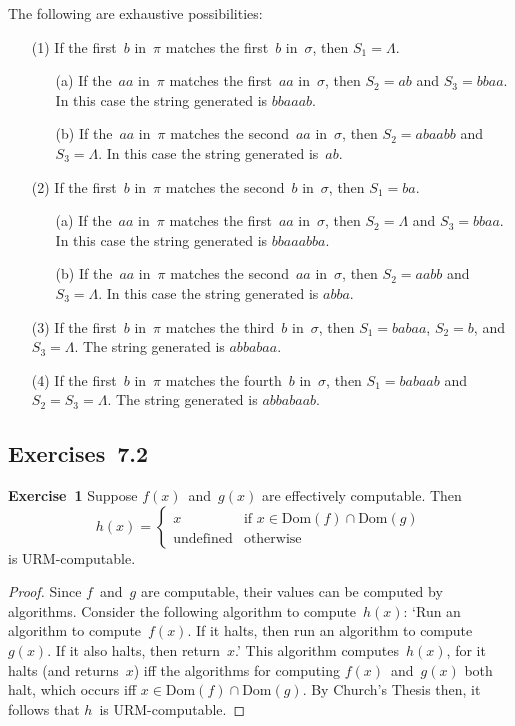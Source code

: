 \documentclass[letterpaper]{article}
\newcommand{\exercise}[2][]{\noindent\textbf{Exercise~{#2}}\ifthenelse{\isempty{#1}}{\textbf{.}}{ ({#1})\textbf{.}}}
\newcommand{\sect}{\cap}
\newcommand{\dom}{\mathrm{Dom}}
\theoremstyle{plain}
\theoremstyle{definition}
\theoremstyle{remark}
\begin{document}
The following are exhaustive possibilities:
\begin{enumerate}[itemsep=0pt]
\item[(1)] If the first~$b$ in~$\pi$ matches the first~$b$ in~$\sigma$, then $S_1=\Lambda$.
\begin{enumerate}[itemsep=0pt]
\item[(a)] If the~$aa$ in~$\pi$ matches the first~$aa$ in~$\sigma$, then $S_2=ab$ and $S_3=bbaa$. In this case the string generated is $bbaaab$.
\item[(b)] If the~$aa$ in~$\pi$ matches the second~$aa$ in~$\sigma$, then $S_2=abaabb$ and $S_3=\Lambda$. In this case the string generated is~$ab$.
\end{enumerate}
\item[(2)] If the first~$b$ in~$\pi$ matches the second~$b$ in~$\sigma$, then $S_1=ba$.
\begin{enumerate}[itemsep=0pt]
\item[(a)] If the~$aa$ in~$\pi$ matches the first~$aa$ in~$\sigma$, then $S_2=\Lambda$ and $S_3=bbaa$. In this case the string generated is $bbaaabba$.
\item[(b)] If the~$aa$ in~$\pi$ matches the second~$aa$ in~$\sigma$, then $S_2=aabb$ and $S_3=\Lambda$. In this case the string generated is $abba$.
\end{enumerate}
\item[(3)] If the first~$b$ in~$\pi$ matches the third~$b$ in~$\sigma$, then $S_1=babaa$, $S_2=b$, and $S_3=\Lambda$. The string generated is $abbabaa$.
\item[(4)] If the first~$b$ in~$\pi$ matches the fourth~$b$ in~$\sigma$, then $S_1=babaab$ and $S_2=S_3=\Lambda$. The string generated is $abbabaab$.
\end{enumerate}

\subsection*{Exercises~7.2}
\exercise{1}
Suppose $f(x)$~and~$g(x)$ are effectively computable. Then
$$h(x)=\begin{cases}
x&\text{if }x\in\dom(f)\sect\dom(g)\\
\text{undefined}&\text{otherwise}
\end{cases}$$
is URM-computable.
\begin{proof}
Since $f$~and~$g$ are computable, their values can be computed by algorithms. Consider the following algorithm to compute~$h(x)$: `Run an algorithm to compute~$f(x)$. If it halts, then run an algorithm to compute~$g(x)$. If it also halts, then return~$x$.' This algorithm computes~$h(x)$, for it halts (and returns~$x$) iff the algorithms for computing $f(x)$~and~$g(x)$ both halt, which occurs iff $x\in\dom(f)\sect\dom(g)$. By Church's Thesis then, it follows that $h$~is URM-computable.
\end{proof}
\end{document}
